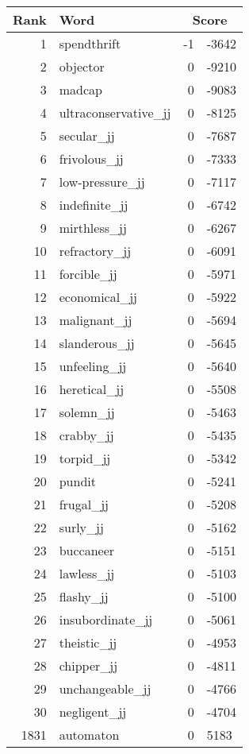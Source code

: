 \begin{longtable}[!htbp]{| rlr@{.}l |}
    \hline
    \textbf{Rank} & \textbf{Word} & \multicolumn{2}{c|}{\textbf{Score}} \\
    \hline
    \endhead
    1 & spendthrift & -1 & -3642 \\
    2 & objector & 0 & -9210 \\
    3 & madcap & 0 & -9083 \\
    4 & ultraconservative\_jj & 0 & -8125 \\
    5 & secular\_jj & 0 & -7687 \\
    6 & frivolous\_jj & 0 & -7333 \\
    7 & low-pressure\_jj & 0 & -7117 \\
    8 & indefinite\_jj & 0 & -6742 \\
    9 & mirthless\_jj & 0 & -6267 \\
    10 & refractory\_jj & 0 & -6091 \\
    11 & forcible\_jj & 0 & -5971 \\
    12 & economical\_jj & 0 & -5922 \\
    13 & malignant\_jj & 0 & -5694 \\
    14 & slanderous\_jj & 0 & -5645 \\
    15 & unfeeling\_jj & 0 & -5640 \\
    16 & heretical\_jj & 0 & -5508 \\
    17 & solemn\_jj & 0 & -5463 \\
    18 & crabby\_jj & 0 & -5435 \\
    19 & torpid\_jj & 0 & -5342 \\
    20 & pundit & 0 & -5241 \\
    21 & frugal\_jj & 0 & -5208 \\
    22 & surly\_jj & 0 & -5162 \\
    23 & buccaneer & 0 & -5151 \\
    24 & lawless\_jj & 0 & -5103 \\
    25 & flashy\_jj & 0 & -5100 \\
    26 & insubordinate\_jj & 0 & -5061 \\
    27 & theistic\_jj & 0 & -4953 \\
    28 & chipper\_jj & 0 & -4811 \\
    29 & unchangeable\_jj & 0 & -4766 \\
    30 & negligent\_jj & 0 & -4704 \\
    1831 & automaton & 0 & 5183 \\

\end{longtable}
